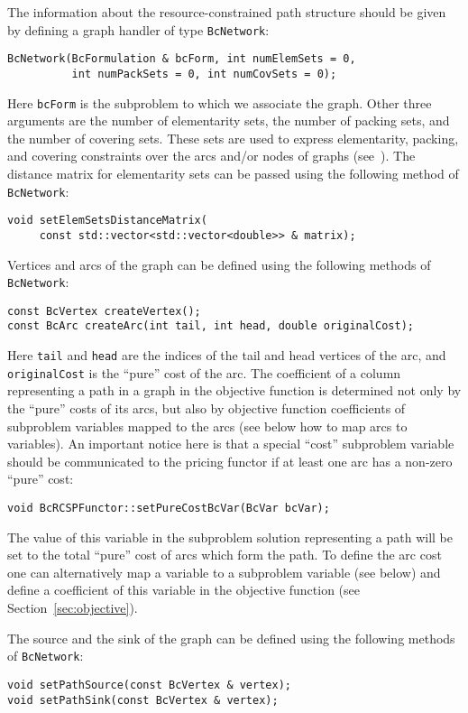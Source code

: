 \documentclass[10pt,a4paper]{article}
\begin{document}
The information about the resource-constrained path structure should be given by defining a graph handler of type
\verb+BcNetwork+:
\begin{lstlisting}
BcNetwork(BcFormulation & bcForm, int numElemSets = 0, 
          int numPackSets = 0, int numCovSets = 0);
\end{lstlisting}
Here \verb+bcForm+ is the subproblem to which we associate the graph. Other three arguments are the number of
elementarity sets, the number of packing sets, and the number of covering sets. These sets are used to express
elementarity, packing, and covering constraints over the arcs and/or nodes of graphs
(see~\cite{PessoaSadykovUchoa:20a}). The distance matrix for elementarity sets can be passed using the following method
of \verb+BcNetwork+:
\begin{lstlisting}
void setElemSetsDistanceMatrix(
     const std::vector<std::vector<double>> & matrix);
\end{lstlisting}

Vertices and arcs of the graph can be defined using the following methods of \verb+BcNetwork+:
\begin{lstlisting}
const BcVertex createVertex();
const BcArc createArc(int tail, int head, double originalCost);
\end{lstlisting}
Here \verb+tail+ and \verb+head+ are the indices of the tail and head vertices of the arc, and \verb+originalCost+ is
the ``pure'' cost of the arc. The coefficient of a column representing a path in a graph in the objective function is
determined not only by the ``pure'' costs of its arcs, but also by objective function coefficients of subproblem
variables mapped to the arcs (see below how to map arcs to variables). An important notice here is that a special
``cost'' subproblem variable should be communicated to the pricing functor if at least one arc has a non-zero ``pure''
cost:
\begin{lstlisting}
void BcRCSPFunctor::setPureCostBcVar(BcVar bcVar);
\end{lstlisting}
The value of this variable in the subproblem solution representing a path will be set to the total ``pure'' cost of arcs
which form the path. To define the arc cost one can alternatively map a variable to a subproblem variable (see below)
and define a coefficient of this variable in the objective function (see Section~\ref{sec:objective}).

The source and the sink of the graph can be defined using the following methods of \verb+BcNetwork+:
\begin{lstlisting}
void setPathSource(const BcVertex & vertex);
void setPathSink(const BcVertex & vertex);
\end{lstlisting}
\end{document}

